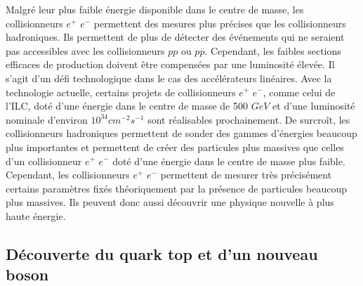    Malgr\'e leur plus faible \'energie disponible dans le centre de masse, les collisionneurs $e^+$ $e^-$ permettent des mesures plus pr\'ecises que les collisionneurs hadroniques. Ils permettent de plus de d\'etecter des \'ev\'enements qui ne seraient pas accessibles avec les collisionneurs $pp$ ou $p\overline{p}$. Cependant, les faibles sections efficaces de production doivent \^etre compens\'ees par une luminosit\'e \'elev\'ee. Il s'agit d'un d\'efi technologique dans le cas des acc\'el\'erateurs lin\'eaires. Avec la technologie actuelle, certains projets de collisionneurs $e^+$ $e^-$, comme celui de l'ILC, dot\'e d'une \'energie dans le centre de masse de 500 $GeV$ et d'une luminosit\'e nominale d'environ $10^{34} cm^{-2}s^{-1}$ sont r\'ealisables prochainement. De surcro\^it, les collisionneurs hadroniques permettent de sonder des gammes d'\'energies beaucoup plus importantes et permettent de cr\'eer des particules plus massives que celles d'un collisionneur $e^+$ $e^-$ dot\'e d'une \'energie dans le centre de masse plus faible. Cependant, les collisionneurs $e^+$ $e^-$ permettent de mesurer très pr\'ecis\'ement certains param\`etres fix\'es th\'eoriquement par la pr\'esence de particules beaucoup plus massives. Ils peuvent donc aussi d\'ecouvrir une physique nouvelle \`a plus haute \'energie.
  
  \FloatBarrier
  
  \subsection{D\'ecouverte du quark top et d'un nouveau boson}
  
